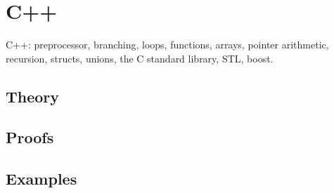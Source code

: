 
\section{C++}
\label{sec:2.3b.02-cpp}

\begin{ticket}
C++: preprocessor, branching, loops, functions, arrays, pointer arithmetic, recursion, structs, unions, the C standard library, STL, boost.
\end{ticket}

\subsection*{Theory}

\subsection*{Proofs}

\subsection*{Examples}
